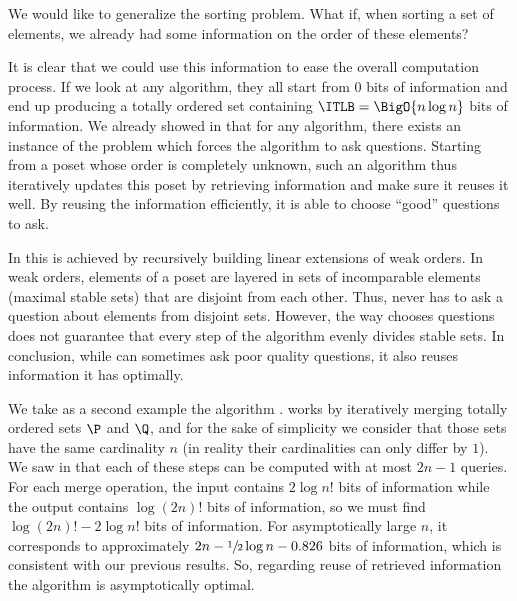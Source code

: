 
We would like to generalize the sorting problem. What if, when sorting a set of
elements, we already had some information on the order of these elements?


It is clear that we could use this information to ease the overall computation
process. If we look at any \BigO{\ITLB} algorithm, they all start from
$0$ bits of information and end up producing a totally ordered set containing
$\ITLB = \BigO{n \log n}$ bits of information. We already showed in
 that for any algorithm, there exists an instance of the
problem which forces the algorithm to ask  questions.
Starting from a poset whose order is completely unknown, such an algorithm
thus iteratively updates this poset by retrieving information and make sure it
reuses it well. By reusing the information efficiently, it is able to
choose ``good'' questions to ask.


In \quicksort this is achieved by recursively building linear extensions of weak
orders. In weak orders, elements of a poset are layered in sets of incomparable
elements (maximal stable sets) that are disjoint from each other.
Thus, \quicksort never has to ask a question about elements from disjoint
sets. However, the way \quicksort chooses questions does not guarantee that every
step of the algorithm evenly divides stable sets. In conclusion, while
\quicksort can sometimes ask poor quality questions, it also reuses information
it has optimally.


We take as a second example the algorithm \mergesort. \mergesort works by
iteratively merging totally ordered sets $\P$ and $\Q$, and for the sake of
simplicity we consider that those sets have the same cardinality $n$  (in
reality their cardinalities can only differ by $1$). We saw in
 that each of these steps can be computed with at most
\(2n-1\) queries. For each merge operation, the input
contains $2 \log n!$ bits of information while the output contains $\log (2n)!$
bits of information, so we must find \(\log (2n)! - 2 \log n!\) bits of
information. For asymptotically large \(n\), it corresponds to approximately
\(2 n - \sfrac{1}{2} \log n - 0.826\) bits of information, which is
consistent with our previous results. So, regarding reuse of retrieved
information the \mergesort algorithm is asymptotically optimal.

